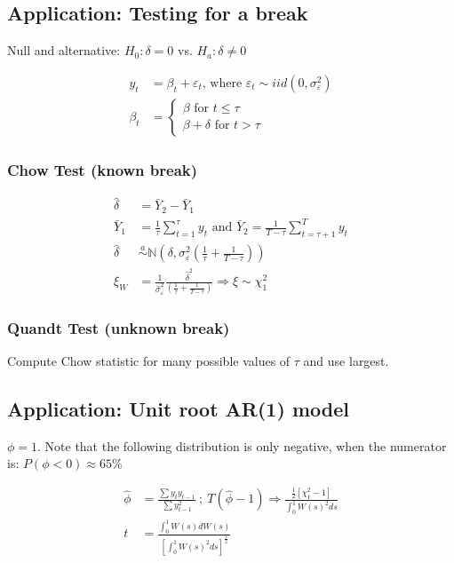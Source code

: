 \subsection{Application: Testing for a break}

Null and alternative: $H_0: \delta=0$ vs. $H_a: \delta \neq 0$

\begin{align*}
    y_t&=\beta_t+\varepsilon_t \text {, where } \varepsilon_t \sim i i d\left(0, \sigma_{\varepsilon}^2\right) \\
    \beta_t&=
    \left\{\begin{array}{c}
    \beta \text { for } t \leq \tau \\
    \beta+\delta \text { for } t>\tau
    \end{array}\right.
\end{align*}

\subsubsection{Chow Test (known break)}

\begin{align*}
    \hat{\delta}&=\bar{Y}_2-\bar{Y}_1 \\
    \bar{Y}_1&=\frac{1}{\tau} \sum_{t=1}^\tau y_t \text { and } \bar{Y}_2=\frac{1}{T-\tau} \sum_{t=\tau+1}^T y_t \\
    \hat{\delta} &\stackrel{a}{\sim} \mathbb{N}\left(\delta, \sigma_{\varepsilon}^2\left(\frac{1}{\tau}+\frac{1}{T-\tau}\right)\right) \\
    \xi_W&=\frac{1}{\hat{\sigma}_{\varepsilon}^2} \frac{\widehat{\delta}^2}{\left(\frac{1}{\tau}+\frac{1}{T-\tau}\right)} \Rightarrow \xi \sim \chi_1^2
\end{align*}

\subsubsection{Quandt Test (unknown break)}

Compute Chow statistic for many possible values of $\tau$ and use largest.

\subsection{Application: Unit root AR(1) model}

$\phi=1$. Note that the following distribution is only negative, when the numerator is: $P(\phi < 0) \approx 65\%$

\begin{align*}
    \widehat{\phi} &= \frac{\sum y_t y_{t-1}}{\sum y_{t-1}^2} \:;\:
    T(\widehat{\phi}-1) \Rightarrow \frac{\frac{1}{2}\left[\chi_1^2-1\right]}{\int_0^1 W(s)^2 d s} \\
    t&=\frac{\int_0^1 W(s) d W(s)}{\left[\int_0^1 W(s)^2 d s\right]^{\frac{1}{2}}}
\end{align*}